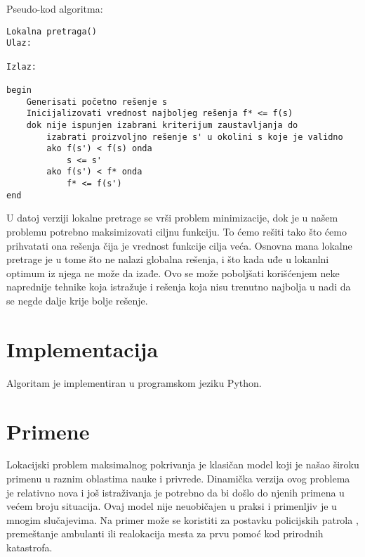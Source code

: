 \documentclass[a4paper]{article}
\begin{document}
Pseudo-kod algoritma:
\begin{verbatim}
Lokalna pretraga()
Ulaz:

Izlaz:

begin
	Generisati početno rešenje s
	Inicijalizovati vrednost najboljeg rešenja f* <= f(s)
	dok nije ispunjen izabrani kriterijum zaustavljanja do
		izabrati proizvoljno rešenje s' u okolini s koje je validno
		ako f(s') < f(s) onda
			s <= s'
		ako f(s') < f* onda
			f* <= f(s')	
end
\end{verbatim}

U datoj verziji lokalne pretrage se vrši problem minimizacije, dok je u našem problemu potrebno maksimizovati ciljnu funkciju. To ćemo rešiti tako što ćemo prihvatati ona rešenja čija je vrednost funkcije cilja veća. Osnovna mana lokalne pretrage je u tome što ne nalazi globalna rešenja, i što kada uđe u lokanlni optimum iz njega ne može da izađe. Ovo se može poboljšati korišćenjem neke naprednije tehnike koja istražuje i rešenja koja nisu trenutno najbolja u nadi da se negde dalje krije bolje rešenje.

\section{Implementacija}

Algoritam je implementiran u programskom jeziku Python. 

\section{Primene}
Lokacijski problem maksimalnog pokrivanja je klasičan model koji je našao široku primenu u raznim oblastima nauke i privrede. Dinamička verzija ovog problema je relativno nova i još istraživanja je potrebno da bi došlo do njenih primena u većem broju situacija. Ovaj model nije neuobičajen u praksi i primenljiv je u mnogim slučajevima. Na primer može se koristiti za postavku policijskih patrola \cite{police}, premeštanje ambulanti \cite{ambulance} ili realokacija mesta za prvu pomoć kod prirodnih katastrofa.

\appendix
 

\end{document}
